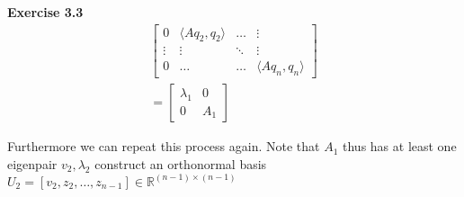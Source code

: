 \documentclass[12pt]{article}
\newcommand{\R}{\mathbb{R}}
\newenvironment{exercise}[1]{\vspace{.1in}\noindent\textbf{Exercise #1 \hspace{.05em}}}{}
\theoremstyle{definition}
\theoremstyle{remark}
\begin{document}
\begin{exercise}{3.3}
\begin{align}
\begin{bmatrix}
			0                               & \langle Aq_2,q_2\rangle & \dots  & \vdots                  \\
			\vdots                          & \vdots                  & \ddots & \vdots                  \\
			0                               & \dots                   & \dots  & \langle Aq_n,q_n\rangle
		\end{bmatrix} \\
		=%
		\begin{bmatrix}
			\lambda_1 & 0   \\
			0         & A_1
		\end{bmatrix}
	\end{align}

	Furthermore we can repeat this process again. Note that $A_1$ thus has at least one eigenpair $v_2,\lambda_2$ construct an orthonormal basis $U_2=[v_2,z_2,\dots,z_{n-1}]\in \R^{(n-1)\times (n-1)}$


\end{exercise}
\end{document}
